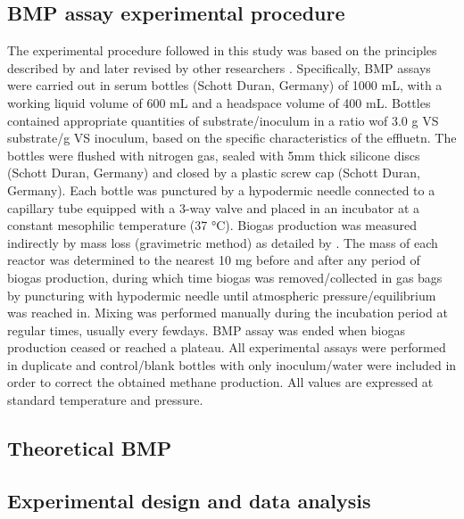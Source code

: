 \subsection{BMP assay experimental procedure}
The experimental procedure followed in this study was based on the principles described by \cite{Owen_1979} and later revised by other researchers \cite{Angelidaki_2009,Holliger_2016}. Specifically, BMP assays were carried out in serum bottles (Schott Duran, Germany) of 1000 mL, with a working liquid volume of 600 mL and a headspace volume of 400 mL. Bottles contained appropriate quantities of substrate/inoculum in a ratio wof 3.0 g VS substrate/g VS inoculum, based on the specific characteristics of the effluetn. The bottles were flushed with nitrogen gas, sealed with 5mm thick silicone discs (Schott Duran, Germany) and closed by a plastic screw cap (Schott Duran, Germany). Each bottle was punctured by a hypodermic needle connected to a capillary tube equipped with a 3-way valve and placed in an incubator at a constant mesophilic temperature (37 °C). Biogas production was measured indirectly by mass loss (gravimetric method) as detailed by \cite{Hafner_2015}. The mass of each reactor was determined to the nearest 10 mg before and after any period of biogas production, during which time biogas was removed/collected in gas bags by puncturing with hypodermic needle until atmospheric pressure/equilibrium was reached in. Mixing was performed manually during the incubation period at regular times, usually every fewdays. BMP assay was ended when biogas production ceased or reached a plateau. All experimental assays were performed in duplicate and control/blank bottles with only inoculum/water were included in order to correct the obtained methane production.  All values are expressed at standard temperature and pressure.
\subsection{Theoretical BMP}

\subsection{Experimental design and data analysis}


